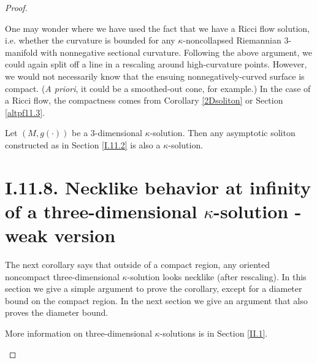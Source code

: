 \begin{proof}
\begin{remark}
 One may wonder where we have used the fact that we have a
Ricci flow solution, i.e. whether the curvature is bounded for
any $\kappa$-noncollapsed Riemannian $3$-manifold with nonnegative
sectional curvature.  Following the above argument, we could again split off
a line in a rescaling around high-curvature points.  However, we would
not necessarily know that the ensuing nonnegatively-curved
surface is compact. ({\it A priori}, it could be a smoothed-out cone, for
example.)  In the case of a Ricci flow, the compactness comes from
Corollary \ref{2Dsoliton} or Section \ref{altpf11.3}.
\end{remark}



\begin{corollary}
  \label{cor:kl-compactness-space-three-dimensional-solutions-kappa-solutions-corollary}

Let $(M,g(\cdot))$ be a $3$-dimensional $\kappa$-solution.
Then any asymptotic soliton constructed as in Section \ref{I.11.2} is
also a $\kappa$-solution.
\end{corollary}


\section{I.11.8. Necklike behavior at infinity of a three-dimensional
$\kappa$-solution - weak version}

The next corollary says that outside of a compact region,  any oriented noncompact
three-dimensional $\kappa$-solution looks necklike (after rescaling).
In this section we give a simple argument to prove the corollary, except for
a diameter bound on the compact region.  In the next section we give an
argument that also proves the diameter bound.

More information on three-dimensional $\kappa$-solutions is in
Section \ref{II.1}.

\begin{definition}
  \label{def:kl-necklike-behavior-at-infinity-three-dimensional-solution-weak-version-kappa-solution-definition}


\end{definition}
\end{proof}
